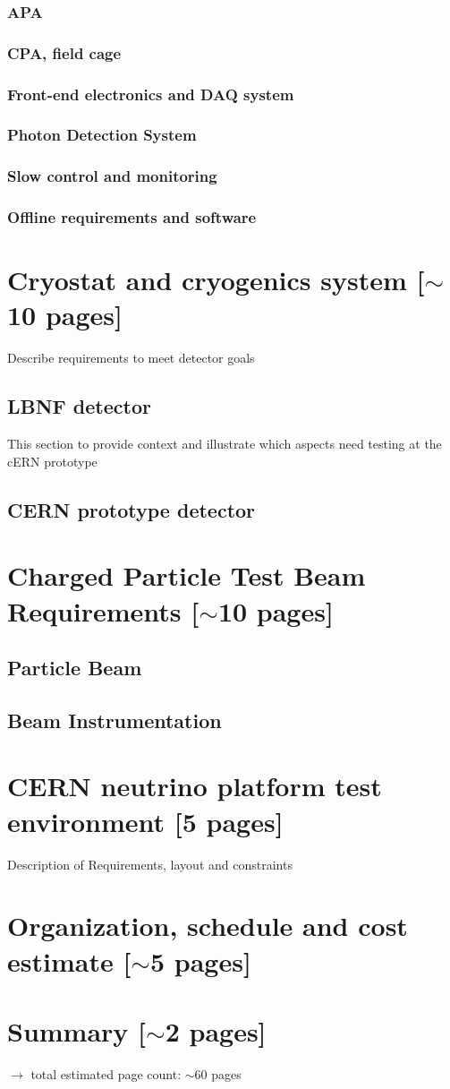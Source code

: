 \documentclass[12pt]{article}
\begin{document}
		\subsubsection{APA}
		\subsubsection{CPA, field cage}
		\subsubsection{Front-end electronics and DAQ system}	
		\subsubsection{Photon Detection System}
		\subsubsection{Slow control and monitoring}
		\subsubsection{Offline requirements and software}

\section{Cryostat and cryogenics system [$\sim$10 pages]}
Describe requirements to meet detector goals
	\subsection{LBNF detector}
This section to provide context and illustrate which aspects need testing at the cERN prototype
	\subsection{CERN prototype detector}


\section{Charged Particle Test Beam Requirements [$\sim$10 pages]}

	\subsection{Particle Beam}
	\subsection{Beam Instrumentation}	

\section{CERN neutrino platform test environment [5 pages]}
Description of Requirements, layout and constraints

\section{Organization, schedule and cost estimate [$\sim$5 pages]}
\section{Summary [$\sim$2 pages]}

$\rightarrow$ total estimated page count: $\sim$60 pages
\end{document}
